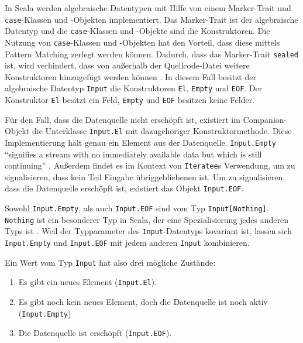 \documentclass[draft=false
              ,paper=a4
              ,twoside=false
              ,fontsize=11pt
              ,headsepline
              ,BCOR10mm
              ,DIV11
              ]{scrbook}
\begin{document}
In Scala werden algebraische Datentypen mit Hilfe von einem Marker-Trait und \lstinline|case|-Klassen und -Objekten implementiert.
Das Marker-Trait ist der algebraische Datentyp und die \lstinline|case|-Klassen und -Objekte sind die Konstruktoren.
Die Nutzung von \lstinline|case|-Klassen und -Objekten hat den Vorteil, dass diese mittels Pattern Matching zerlegt werden können.
Dadurch, dass das Marker-Trait \lstinline|sealed| ist, wird verhindert, dass von außerhalb der Quellcode-Datei weitere Konstruktoren hinzugefügt werden können \cite[vgl.][]{algebraic_data_type_scala}.
In diesem Fall besitzt der algebraische Datentyp \lstinline|Input| die Konstruktoren \lstinline|El|, \lstinline|Empty| und \lstinline|EOF|.
Der Konstruktor \lstinline|El| besitzt ein Feld, \lstinline|Empty| und \lstinline|EOF| besitzen keine Felder.

Für den Fall, dass die Datenquelle nicht erschöpft ist, existiert im Companion-Objekt die Unterklasse \lstinline|Input.El| mit dazugehöriger Konstruktormethode.
Diese Implementierung hält genau ein Element aus der Datenquelle.
\lstinline|Input.Empty| "`signifies a stream with no immediately available data but which is still continuing"' \cite[vgl.][]{iteratee_io}.
Außerdem findet es im Kontext von \lstinline|Iteratee|s Verwendung, um zu signalisieren, dass kein Teil Eingabe übriggebliebenen ist.
Um zu signalisieren, dass die Datenquelle erschöpft ist, existiert das Objekt \lstinline|Input.EOF|.

Sowohl \lstinline|Input.Empty|, als auch \lstinline|Input.EOF| sind vom Typ \lstinline|Input[Nothing]|.
\lstinline|Nothing| ist ein besonderer Typ in Scala, der eine Spezialisierung jedes anderen Typs ist \cite[vgl.][S.~32]{scala_specification}.
Weil der Typparameter des \lstinline|Input|-Datentyps kovariant ist, lassen sich \lstinline|Input.Empty| und \lstinline|Input.EOF| mit jedem anderen \lstinline|Input| kombinieren.

Ein Wert vom Typ \lstinline|Input| hat also drei mögliche Zustände:
\begin{enumerate}
  \item Es gibt ein neues Element (\lstinline|Input.El|).
  \item Es gibt noch kein neues Element, doch die Datenquelle ist noch aktiv (\lstinline|Input.Empty|)
  \item Die Datenquelle ist erschöpft (\lstinline|Input.EOF|).
\end{enumerate}
\end{document}

